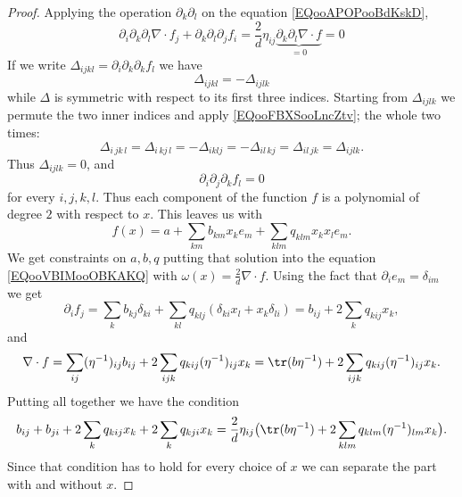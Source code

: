 \begin{proof}
	Applying the operation \( \partial_k\partial_l\) on the equation \eqref{EQooAPOPooBdKskD},
	\begin{equation}
		\partial_i\partial_k\partial_l\nabla\cdot f_j+\partial_k\partial_l\partial_j f_i=\frac{ 2 }{ d }\eta_{ij}\underbrace{\partial_k\partial_l\nabla\cdot f}_{=0}=0
	\end{equation}
	If we write \( \Delta_{ijkl}=\partial_i\partial_k\partial_k f_l\) we have
	\begin{equation}    \label{EQooFBXSooLncZtv}
		\Delta_{ijkl}=-\Delta_{ijlk}
	\end{equation}
	while \( \Delta\) is symmetric with respect to its first three indices. Starting from \( \Delta_{ijlk}\) we permute the two inner indices and apply \eqref{EQooFBXSooLncZtv}; the whole two times:
	\begin{equation}
		\Delta_{i\,jk\,l}=\Delta_{i\,kj\,l}=-\Delta_{iklj}=-\Delta_{il\,kj}=\Delta_{il\,jk}=\Delta_{ijlk}.
	\end{equation}
	Thus \( \Delta_{ijlk}=0\), and
	\begin{equation}
		\partial_i\partial_j\partial_kf_l=0
	\end{equation}
	for every \( i,j,k,l\). Thus each component of the function \( f\) is a polynomial of degree \( 2\) with respect to \( x\). This leaves us with
	\begin{equation}
		f(x)=a+\sum_{km}b_{km}x_ke_m+\sum_{klm}q_{klm}x_kx_le_m.
	\end{equation}
	We get constraints on \( a,b,q\) putting that solution into the equation \eqref{EQooVBIMooOBKAKQ} with \( \omega(x)=\frac{ 2 }{ d }\nabla\cdot f\). Using the fact that \( \partial_ie_m=\delta_{im}\) we get
	\begin{equation}
		\partial_if_j=\sum_kb_{kj}\delta_{ki}+\sum_{kl}q_{klj}(\delta_{ki}x_l+x_k\delta_{li})=b_{ij}+2\sum_kq_{kij}x_k,
	\end{equation}
	and
	\begin{equation}
		\nabla\cdot f=\sum_{ij}(\eta^{-1})_{ij}b_{ij}+2\sum_{ijk}q_{kij}(\eta^{-1})_{ij}x_k=\tr(b\eta^{-1})+2\sum_{ijk}q_{kij}(\eta^{-1})_{ij}x_k.
	\end{equation}
	Putting all together we have the condition
	\begin{equation}
		b_{ij}+b_{ji}+2\sum_{k}q_{kij}x_k+2\sum_kq_{kji}x_k=\frac{ 2 }{ d }\eta_{ij}\big( \tr(b\eta^{-1})+2\sum_{klm}q_{klm}(\eta^{-1})_{lm}x_k \big).
	\end{equation}
	Since that condition has to hold for every choice of \( x\) we can separate the part with and without \( x\).


\end{proof}
